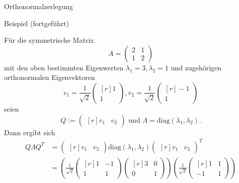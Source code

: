 \documentclass[
  8pt,
  ignorenonframetext,
]{beamer}
\begin{document}
\begin{frame}{Orthonormalzerlegung}
\protect\hypertarget{orthonormalzerlegung-3}{}
\small
\vspace{2mm}

Beispiel (fortgeführt)

\footnotesize

Für die symmetrische Matrix \begin{equation}
A = \begin{pmatrix} 2 & 1 \\ 1 & 2 \end{pmatrix}
\end{equation} mit den oben bestimmten Eigenwerten
\(\lambda_1 = 3,\lambda_2 = 1\) und zugehörigen orthonormalen
Eigenvektoren \begin{equation}
v_1 = \frac{1}{\sqrt{2}}
\begin{pmatrix*}[r]
1 \\
1 
\end{pmatrix*},
v_2 = \frac{1}{\sqrt{2}}
\begin{pmatrix*}[r]
-1 \\
1 
\end{pmatrix*}
\end{equation} seien \begin{equation}
Q := \begin{pmatrix*}[r]
v_1 & v_2
\end{pmatrix*}
\mbox{ und }
\Lambda = \mbox{diag}(\lambda_1,\lambda_2).
\end{equation} Dann ergibt sich \begin{align*}
Q\Lambda Q^T
& =
\begin{pmatrix*}[r]
v_1 & v_2
\end{pmatrix*}
\mbox{diag}(\lambda_1,\lambda_2)
\begin{pmatrix*}[r]
v_1 & v_2
\end{pmatrix*}^T \\
& =
\left(
\frac{1}{\sqrt{2}}
\begin{pmatrix*}[r]
1 & -1\\
1 &  1
\end{pmatrix*}
\begin{pmatrix*}[r]
3 & 0 \\
0 & 1
\end{pmatrix*}
\right)
\left(
\frac{1}{\sqrt{2}}
\begin{pmatrix*}[r]
 1 &  1 \\
-1 &  1
\end{pmatrix*}
\right)
\\

\end{align*}
\end{frame}
\end{document}

